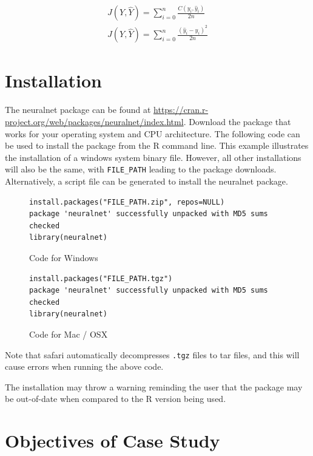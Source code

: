 \begin{gather*}
J(Y,\hat Y)=\sum_{i=0}^{n} \frac{C(y_i,\hat y_i)}{2n} \\
J(Y,\hat Y)=\sum_{i=0}^{n} \frac{(\hat y_i - y_i)^2}{2n}
\end{gather*}

\section{Installation}

The neuralnet package can be found at \url{https://cran.r-project.org/web/packages/neuralnet/index.html}.
Download the package that works for your operating system and CPU architecture.
The following code can be used to install the package from the R command line.
This example illustrates the installation of a windows system binary file.
However, all other installations will also be the same, with \texttt{FILE\_PATH} leading to the package downloads.
Alternatively, a script file can be generated to install the neuralnet package. 
\begin{figure}[h]
\caption{Code for Windows}
\begin{lstlisting}
install.packages("FILE_PATH.zip", repos=NULL)
package 'neuralnet' successfully unpacked with MD5 sums checked
library(neuralnet)
\end{lstlisting}
\end{figure}

\begin{figure}[h]
\caption{Code for Mac / OSX}
\begin{lstlisting}
install.packages("FILE_PATH.tgz")
package 'neuralnet' successfully unpacked with MD5 sums checked
library(neuralnet)
\end{lstlisting}
\end{figure}

Note that safari automatically decompresses \texttt{.tgz} files to tar files, and this will cause errors when running the above code.

The installation may throw a warning reminding the user that the package may be out-of-date when compared to the R version being used. 

\section{Objectives of Case Study}

